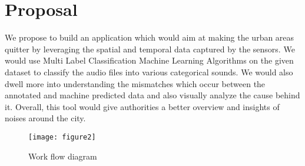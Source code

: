 	\section{Proposal}
	We propose to build an application which would aim at making the urban areas quitter by leveraging the spatial and temporal data captured by the sensors. We would use Multi Label Classification Machine Learning Algorithms on the given dataset to classify the audio files into various categorical sounds. We would also dwell more into understanding the mismatches which occur between the annotated and machine predicted data and also visually analyze the cause behind it.  Overall, this tool would give authorities a better overview and insights of noises around the city.
	\begin{figure}[h!]
	\texttt{[image: figure2]}
	\caption{ Work flow diagram}
	\end{figure}
	
	
